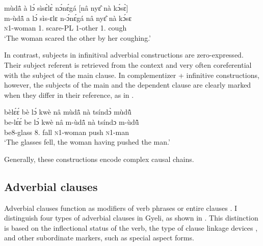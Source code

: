 \ea\label{COMPINF1}
  \glll mùdã̂ à lɔ́ sìsɛ̀lɛ̀ nɔ́nɛ́gá [nâ nyɛ̂ nà kɔ́sɛ̀]\\
m-ùdã̂ a lɔ́ sìs-ɛlɛ n-ɔ́nɛ́gá {\db}nâ nyɛ̂ nà kɔ́sɛ \\
\textsc{n}1-woman 1.{\PST} {\RETRO} scare-{\AP}PL 1-other {\db}{\COMP} 1.{\SBJ} {\COM} cough \\
  \trans `The woman scared the other by her coughing.'
\z

In contrast, subjects in infinitival adverbial constructions are zero-expressed. Their subject referent is retrieved from the context and very often coreferential with the subject of the main clause. In complementizer + infinitive constructions, however, the subjects of the main and the dependent clause are clearly marked when they differ in their reference, as in .



\ea\label{COMPINF2}
  \glll 
bèlɛ́ɛ́ bè lɔ́ kwè nâ mùdã̂ nà tsíndɔ̀ mùdũ̂ \\
be-lɛ́ɛ́ be lɔ́ kwè nâ m-ùdã̂ nà tsíndɔ m-ùdũ̂ \\
be8-glass 8.{\PST} {\RETRO} fall {\COMP} \textsc{n}1-woman {\COM} push \textsc{n}1-man \\
\trans `The glasses fell, the woman having pushed the man.'
\z

Generally, these constructions encode complex causal chains.











\subsection{Adverbial clauses}
\label{sec:ADVC}

Adverbial clauses function as modifiers of verb phrases or entire clauses \citep{thompson2007}.
I distinguish four types of adverbial clauses in Gyeli, as shown in . This distinction is based on the inflectional status of the verb, the type of clause linkage devices \citep{hetterle2015}, and other subordinate markers, such as special aspect forms.

